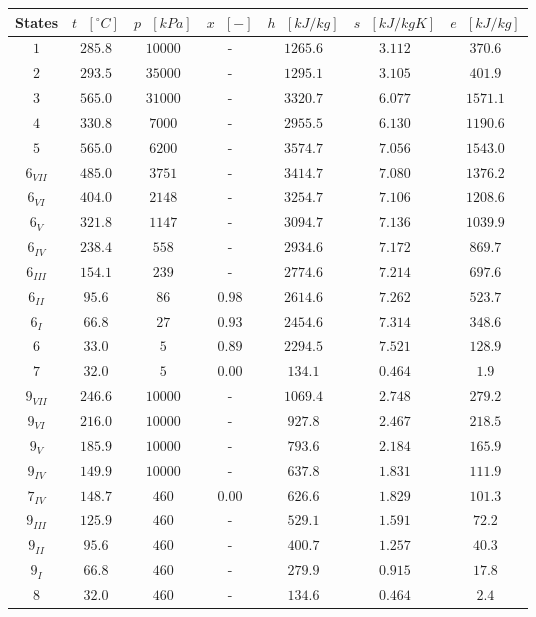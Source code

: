\begin{center}
\begin{longtable}{|c|c|c|c|c|c|c|}
    \hline
    States & $t \text{ } [^\circ C]$ & $p \text{ } [kPa]$ & $x \text{ } [-]$ & $h \text{ } [kJ/kg]$ & $s \text{ } [kJ/kgK]$ & $e \text{ } [kJ/kg]$\\
    \hline
    \endhead
    \hline
    \endfoot
    $1$ & $285.8$ & $10000$ & - & $1265.6$ & $3.112$ & $370.6$ \\
    $2$ & $293.5$ & $35000$ & - & $1295.1$ & $3.105$ & $401.9$ \\
    $3$ & $565.0$ & $31000$ & - & $3320.7$ & $6.077$ & $1571.1$ \\
    $4$ & $330.8$ & $7000$ & - & $2955.5$ & $6.130$ & $1190.6$ \\
    $5$ & $565.0$ & $6200$ & - & $3574.7$ & $7.056$ & $1543.0$ \\
    $6_{VII}$ & $485.0$ & $3751$ & - & $3414.7$ & $7.080$ & $1376.2$ \\
    $6_{VI}$ & $404.0$ & $2148$ & - & $3254.7$ & $7.106$ & $1208.6$ \\
    $6_{V}$ & $321.8$ & $1147$ & - & $3094.7$ & $7.136$ & $1039.9$ \\
    $6_{IV}$ & $238.4$ & $558$ & - & $2934.6$ & $7.172$ & $869.7$ \\
    $6_{III}$ & $154.1$ & $239$ & - & $2774.6$ & $7.214$ & $697.6$ \\
    $6_{II}$ & $95.6$ & $86$ & $0.98$ & $2614.6$ & $7.262$ & $523.7$ \\
    $6_I$ & $66.8$ & $27$ & $0.93$ & $2454.6$ & $7.314$ & $348.6$ \\
    $6$ & $33.0$ & $5$ & $0.89$ & $2294.5$ & $7.521$ & $128.9$ \\
    $7$ & $32.0$ & $5$ & $0.00$ & $134.1$ & $0.464$ & $1.9$ \\
    $9_{VII}$ & $246.6$ & $10000$ & - & $1069.4$ & $2.748$ & $279.2$ \\
    $9_{VI}$ & $216.0$ & $10000$ & - & $927.8$ & $2.467$ & $218.5$ \\
    $9_V$ & $185.9$ & $10000$ & - & $793.6$ & $2.184$ & $165.9$ \\
    $9_{IV}$ & $149.9$ & $10000$ & - & $637.8$ & $1.831$ & $111.9$ \\
    $7_{IV}$ & $148.7$ & $460$ & $0.00$ & $626.6$ & $1.829$ & $101.3$ \\
    $9_{III}$ & $125.9$ & $460$ & - & $529.1$ & $1.591$ & $72.2$ \\
    $9_{II}$ & $95.6$ & $460$ & - & $400.7$ & $1.257$ & $40.3$ \\
    $9_I$ & $66.8$ & $460$ & - & $279.9$ & $0.915$ & $17.8$ \\
    $8$ & $32.0$ & $460$ & - & $134.6$ & $0.464$ & $2.4$ \\
\end{longtable}
\end{center}

